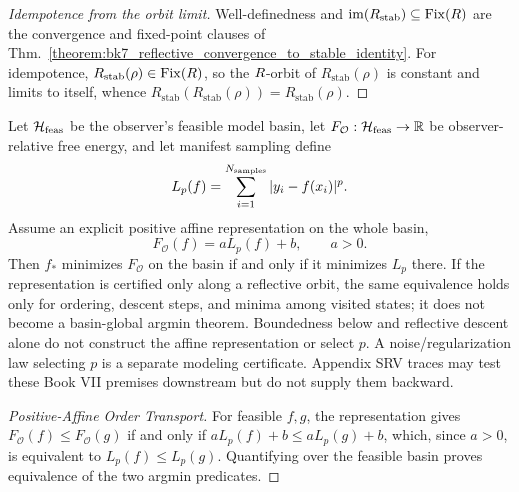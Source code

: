\begin{proof}[Idempotence from the orbit limit]
\label{proof:bk7_stabilization_as_orbit_limit}
\leavevmode
Well-definedness and $\operatorname{im}(R_{\mathrm{stab}}) \subseteq \operatorname{Fix}(R)$ are the convergence and fixed-point clauses of Thm.~\ref{theorem:bk7_reflective_convergence_to_stable_identity}. For idempotence, $R_{\mathrm{stab}}(\rho) \in \operatorname{Fix}(R)$, so the $R$-orbit of $R_{\mathrm{stab}}(\rho)$ is constant and limits to itself, whence $R_{\mathrm{stab}}(R_{\mathrm{stab}}(\rho)) = R_{\mathrm{stab}}(\rho)$.
\end{proof}

\begin{theorem}
\label{theorem:bk7_observer_relative_free_energy_minimization_as_lp_regression}
Let $\mathcal H_{\rm feas}$ be the observer's feasible model basin, let
$F_{\mathcal O}:\mathcal H_{\rm feas}\to\mathbb R$ be observer-relative free
energy, and let manifest sampling define
\[
 L_p(f)=\sum_{i=1}^{N_{\rm samples}}|y_i-f(x_i)|^p.
\]
Assume an explicit positive affine representation on the whole basin,
\[
 F_{\mathcal O}(f)=aL_p(f)+b,\qquad a>0.
\]
Then $f_*$ minimizes $F_{\mathcal O}$ on the basin if and only if it minimizes
$L_p$ there.  If the representation is certified only along a reflective
orbit, the same equivalence holds only for ordering, descent steps, and minima
among visited states; it does not become a basin-global argmin theorem.
Boundedness below and reflective descent alone do not construct the affine
representation or select $p$.  A noise/regularization law selecting $p$ is a
separate modeling certificate.  Appendix SRV traces may test these Book VII
premises downstream but do not supply them backward.
\end{theorem}

\begin{proof}[Positive-Affine Order Transport]
\label{proof:bk7_observer_relative_symbolic_stabilization_as_statistical_inference}
\leavevmode
For feasible $f,g$, the representation gives
$F_{\mathcal O}(f)\leq F_{\mathcal O}(g)$ if and only if
$aL_p(f)+b\leq aL_p(g)+b$, which, since $a>0$, is equivalent to
$L_p(f)\leq L_p(g)$.  Quantifying over the feasible basin proves equivalence
of the two argmin predicates.
\end{proof}

